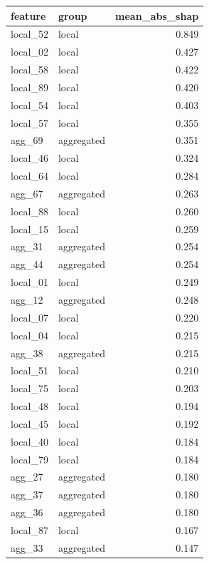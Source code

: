 \begin{tabular}{llr}
\toprule
feature & group & mean_abs_shap \\
\midrule
local_52 & local & 0.849 \\
local_02 & local & 0.427 \\
local_58 & local & 0.422 \\
local_89 & local & 0.420 \\
local_54 & local & 0.403 \\
local_57 & local & 0.355 \\
agg_69 & aggregated & 0.351 \\
local_46 & local & 0.324 \\
local_64 & local & 0.284 \\
agg_67 & aggregated & 0.263 \\
local_88 & local & 0.260 \\
local_15 & local & 0.259 \\
agg_31 & aggregated & 0.254 \\
agg_44 & aggregated & 0.254 \\
local_01 & local & 0.249 \\
agg_12 & aggregated & 0.248 \\
local_07 & local & 0.220 \\
local_04 & local & 0.215 \\
agg_38 & aggregated & 0.215 \\
local_51 & local & 0.210 \\
local_75 & local & 0.203 \\
local_48 & local & 0.194 \\
local_45 & local & 0.192 \\
local_40 & local & 0.184 \\
local_79 & local & 0.184 \\
agg_27 & aggregated & 0.180 \\
agg_37 & aggregated & 0.180 \\
agg_36 & aggregated & 0.180 \\
local_87 & local & 0.167 \\
agg_33 & aggregated & 0.147 \\
\bottomrule
\end{tabular}
